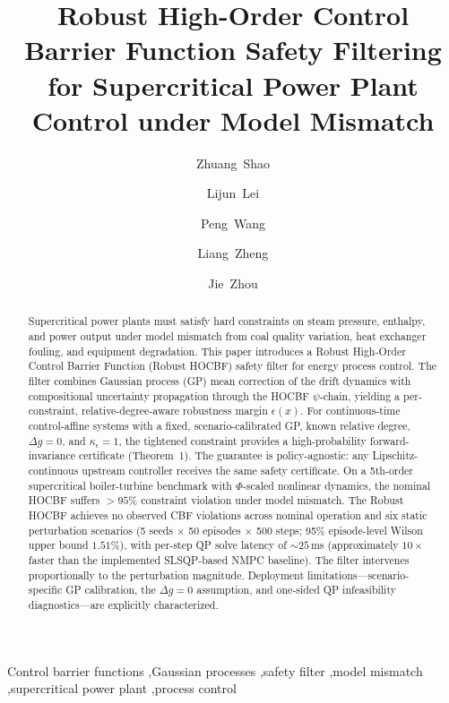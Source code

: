 \documentclass[final,5p,times,twocolumn]{elsarticle}
\begin{document}
\begin{frontmatter}

\title{Robust High-Order Control Barrier Function Safety Filtering for Supercritical Power Plant Control under Model Mismatch}

\author[1]{Zhuang~Shao}
\author[2]{Lijun~Lei}
\author[3]{Peng~Wang}
\author[2]{Liang~Zheng}
\author[2]{Jie~Zhou}


\address[1]{China Resources Power Technology Research Institute Co., Ltd., Shenzhen 518000, Guangdong Province, China}
\address[2]{Rundian Energy Science and Technology Co., Ltd., Zhengzhou 450052, Henan Province, China}
\address[3]{North China University of Water Resources and Electric Power, Zhengzhou 450046, Henan Province, China}

\begin{abstract}
Supercritical power plants must satisfy hard constraints on steam pressure, enthalpy, and power output under model mismatch from coal quality variation, heat exchanger fouling, and equipment degradation. This paper introduces a Robust High-Order Control Barrier Function (Robust HOCBF) safety filter for energy process control. The filter combines Gaussian process (GP) mean correction of the drift dynamics with compositional uncertainty propagation through the HOCBF $\psi$-chain, yielding a per-constraint, relative-degree-aware robustness margin $\epsilon(x)$. For continuous-time control-affine systems with a fixed, scenario-calibrated GP, known relative degree, $\Delta g = 0$, and $\kappa_\epsilon = 1$, the tightened constraint provides a high-probability forward-invariance certificate (Theorem~1). The guarantee is policy-agnostic: any Lipschitz-continuous upstream controller receives the same safety certificate. On a 5th-order supercritical boiler-turbine benchmark with $\Phi$-scaled nonlinear dynamics, the nominal HOCBF suffers $>95\%$ constraint violation under model mismatch. The Robust HOCBF achieves no observed CBF violations across nominal operation and six static perturbation scenarios (5 seeds $\times$ 50 episodes $\times$ 500 steps; 95\% episode-level Wilson upper bound $1.51\%$), with per-step QP solve latency of ${\sim}25$\,ms (approximately $10\times$ faster than the implemented SLSQP-based NMPC baseline). The filter intervenes proportionally to the perturbation magnitude. Deployment limitations---scenario-specific GP calibration, the $\Delta g = 0$ assumption, and one-sided QP infeasibility diagnostics---are explicitly characterized.
\end{abstract}

\begin{keyword}
Control barrier functions \sep Gaussian processes \sep safety filter \sep model mismatch \sep supercritical power plant \sep process control
\end{keyword}

\end{frontmatter}
\end{document}
